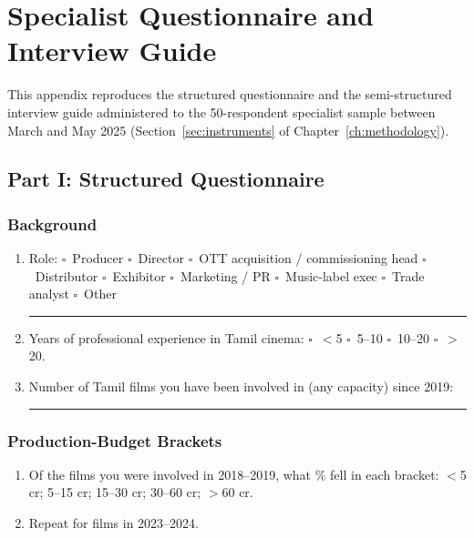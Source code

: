 \chapter{Specialist Questionnaire and Interview Guide}
\label{app:specialist_q}

\noindent
This appendix reproduces the structured questionnaire and the
semi-structured interview guide administered to the 50-respondent
specialist sample between March and May 2025
(Section~\ref{sec:instruments} of Chapter~\ref{ch:methodology}).

\section*{Part I: Structured Questionnaire}

\subsection*{Background}
\begin{enumerate}[itemsep=2pt]
  \item Role: $\square$~Producer \quad $\square$~Director \quad
        $\square$~OTT acquisition / commissioning head \quad
        $\square$~Distributor \quad $\square$~Exhibitor \quad
        $\square$~Marketing / PR \quad $\square$~Music-label exec \quad
        $\square$~Trade analyst \quad $\square$~Other
        \rule{2cm}{0.4pt}
  \item Years of professional experience in Tamil cinema:
        $\square$~$<$5 \quad $\square$~5--10 \quad $\square$~10--20
        \quad $\square$~$>$20.
  \item Number of Tamil films you have been involved in (any
        capacity) since 2019: \rule{2cm}{0.4pt}
\end{enumerate}

\subsection*{Production-Budget Brackets}
\begin{enumerate}[resume,itemsep=2pt]
  \item Of the films you were involved in 2018--2019, what \% fell in
        each bracket: $<$5 cr; 5--15 cr; 15--30 cr; 30--60 cr;
        $>$60 cr.
  \item Repeat for films in 2023--2024.
\end{enumerate}

